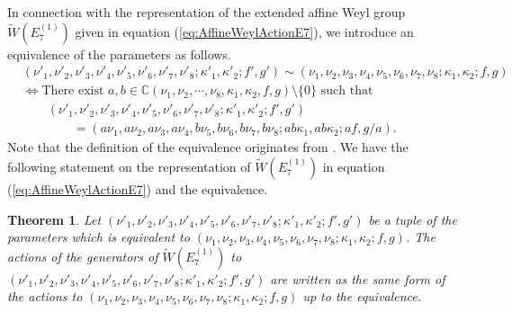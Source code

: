 \documentclass[12pt]{amsart}
\newcommand{\C}{\mathbb {C}}     %
\numberwithin{equation}{section}
\newtheorem{thm}[prop]{\bf Theorem}
\theoremstyle{definition}
\begin{document}
In connection with the representation of the extended affine Weyl group $\widetilde{W}(E^{(1)}_{7})$ given in equation (\ref{eq:AffineWeylActionE7}), we introduce an equivalence of the parameters as follows.
\begin{align}
&  (\nu '_1 , \nu '_2 , \nu '_3 , \nu '_4 ,\nu '_5 ,\nu '_6 , \nu '_7 ,\nu '_8 ; \kappa '_1 ,\kappa '_2 ; f' ,g' ) \sim  (\nu_1 , \nu_2 , \nu_3 , \nu_4 ,\nu_5 ,\nu_6 , \nu_7 ,\nu_8 ;\kappa_1 ,\kappa_2 ; f ,g ) \label{eq:equivE7} \\
& \Leftrightarrow \mbox{There exist } a, b \in \C (\nu_1 , \nu_2 , \cdots ,\nu_8 ,\kappa_1 ,\kappa_2 , f ,g ) \setminus \{ 0 \} \mbox{ such that }  \nonumber \\
& \qquad (\nu '_1 , \nu '_2 , \nu '_3 , \nu '_4 ,\nu '_5 ,\nu '_6 , \nu '_7 ,\nu '_8 ; \kappa '_1 ,\kappa '_2 ; f' ,g' )  \nonumber \\
& \qquad \qquad = (a \nu_1 , a \nu_2 , a \nu_3 , a \nu_4 ,b \nu_5 , b \nu_6 , b \nu_7 , b \nu_8 ; ab \kappa_1 , ab \kappa_2 ; af ,g/a) .  \nonumber
\end{align}
Note that the definition of the equivalence originates from \cite[(4.7)]{TsqP}.
We have the following statement on the representation of $\widetilde{W}(E^{(1)}_{7})$ in equation (\ref{eq:AffineWeylActionE7}) and the equivalence.
\begin{thm}
Let $(\nu '_1 , \nu '_2 , \nu '_3 , \nu '_4 ,\nu '_5 ,\nu '_6 , \nu '_7 ,\nu '_8 ; \kappa '_1 ,\kappa '_2 ; f' ,g' ) $ be a tuple of the parameters which is equivalent to $ (\nu_1 , \nu_2 , \nu_3 , \nu_4 ,\nu_5 ,\nu_6 , \nu_7 ,\nu_8 ;\kappa_1 ,\kappa_2 ; f ,g )$.
The actions of the generators of  $\widetilde{W}(E^{(1)}_7)$ to $(\nu '_1 , \nu '_2 , \nu '_3 , \nu '_4 ,\nu '_5 ,\nu '_6 , \nu '_7 ,\nu '_8 ; \kappa '_1 ,\kappa '_2 ; f' ,g' ) $ are written as the same form of the actions to $(\nu _1 , \nu _2 , \nu _3 , \nu _4 ,\nu _5 ,\nu _6 , \nu _7 ,\nu _8 ; \kappa _1 ,\kappa _2 ; f ,g ) $ up to the equivalence.
\end{thm}
\end{document}
